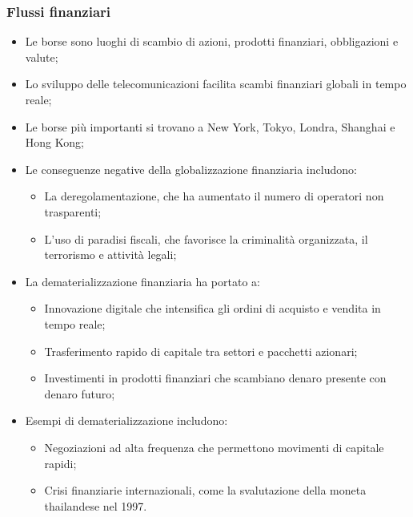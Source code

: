 \documentclass{article}
\begin{document}
\subsubsection{Flussi finanziari}
\begin{itemize}
    \item Le borse sono luoghi di scambio di azioni, prodotti finanziari, obbligazioni e valute;
    \item Lo sviluppo delle telecomunicazioni facilita scambi finanziari globali in tempo reale;
    \item Le borse più importanti si trovano a New York, Tokyo, Londra, Shanghai e Hong Kong;
    \item Le conseguenze negative della globalizzazione finanziaria includono:
        \begin{itemize}
            \item La deregolamentazione, che ha aumentato il numero di operatori non
                trasparenti;
            \item L'uso di paradisi fiscali, che favorisce la criminalità organizzata, il
                terrorismo e attività legali;
        \end{itemize}
    \item La dematerializzazione finanziaria ha portato a:
        \begin{itemize}
            \item Innovazione digitale che intensifica gli ordini di acquisto e vendita in
                tempo reale;
            \item Trasferimento rapido di capitale tra settori e pacchetti azionari;
            \item Investimenti in prodotti finanziari che scambiano denaro presente con denaro
                futuro;
        \end{itemize}
    \item Esempi di dematerializzazione includono:
        \begin{itemize}
            \item Negoziazioni ad alta frequenza che permettono movimenti di capitale rapidi;
            \item Crisi finanziarie internazionali, come la svalutazione della moneta
                thailandese nel 1997.
        \end{itemize}
\end{itemize}
\end{document}
